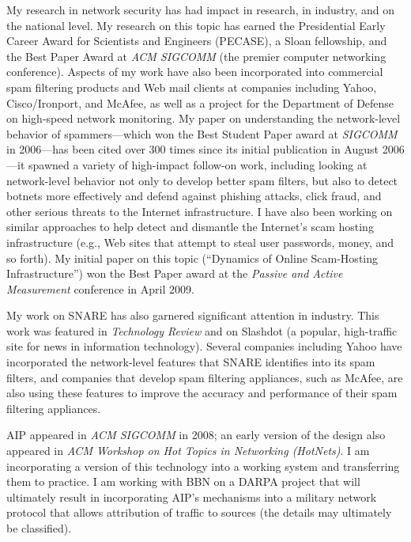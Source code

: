 My research in network security has had impact in research, in industry,
and on the national level.  My research on this topic has earned the
Presidential Early Career Award for Scientists and Engineers (PECASE), a
Sloan fellowship, and the Best Paper Award at {\em ACM SIGCOMM} (the
premier computer networking conference).  Aspects of my work have also
been incorporated into commercial spam filtering products and Web mail
clients at companies including Yahoo, Cisco/Ironport, and McAfee, as
well as a project for the Department of Defense on high-speed network
monitoring.  My paper on understanding the network-level behavior of
spammers---which won the Best Student Paper award at {\em SIGCOMM} in
2006---has been cited over 300 times since its initial publication in
August 2006---it spawned a variety of high-impact follow-on work,
including looking at network-level behavior not only to develop better
spam filters, but also to detect botnets more effectively and defend
against phishing attacks, click fraud, and other serious threats to the
Internet infrastructure.  I have also been working on similar approaches
to help detect and dismantle the Internet's scam hosting infrastructure
(e.g., Web sites that attempt to steal user passwords, money, and so
forth).  My initial paper on this topic (``Dynamics of Online
Scam-Hosting Infrastructure'') won the Best Paper award at the {\em
Passive and Active Measurement} conference in April 2009.

My work on SNARE has also garnered significant attention in industry.
This work was featured in {\em Technology Review} and on Slashdot (a
popular, high-traffic site for news in information technology).  Several
companies including Yahoo have incorporated the network-level features
that SNARE identifies into its spam filters, and companies that develop
spam filtering appliances, such as McAfee, are also using these features
to improve the accuracy and performance of their spam filtering
appliances.

AIP appeared in {\em ACM SIGCOMM} in 2008; an early version of the
design also appeared in {\em ACM Workshop on Hot Topics in Networking
(HotNets)}.  I am incorporating a version of this technology into a
working system and transferring them to practice.  I am working with BBN
on a DARPA project that will ultimately result in incorporating AIP's
mechanisms into a military network protocol that allows attribution of
traffic to sources (the details may ultimately be classified). 

